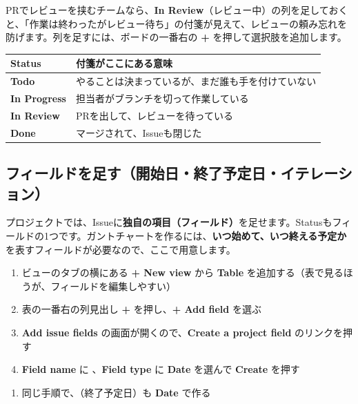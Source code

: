 PRでレビューを挟むチームなら、\textbf{In Review}（レビュー中）の列を足しておくと、「作業は終わったがレビュー待ち」の付箋が見えて、レビューの頼み忘れを防げます。列を足すには、ボードの一番右の \textbf{+} を押して選択肢を追加します。

\begin{center}
\begin{tabularx}{\linewidth}{@{}>{\raggedright\arraybackslash}p{3.0cm} X@{}}
\toprule
Status & 付箋がここにある意味 \\
\midrule
\textbf{Todo} & やることは決まっているが、まだ誰も手を付けていない \\
\textbf{In Progress} & 担当者がブランチを切って作業している \\
\textbf{In Review} & PRを出して、レビューを待っている \\
\textbf{Done} & マージされて、Issueも閉じた \\
\bottomrule
\end{tabularx}
\end{center}

\subsection{フィールドを足す（開始日・終了予定日・イテレーション）}

プロジェクトでは、Issueに\textbf{独自の項目（フィールド）}を足せます。Statusもフィールドの1つです。ガントチャートを作るには、\textbf{いつ始めて、いつ終える予定か}を表すフィールドが必要なので、ここで用意します。

\begin{enumerate}[leftmargin=1.6em]
  \item ビューのタブの横にある \textbf{+ New view} から \textbf{Table} を追加する（表で見るほうが、フィールドを編集しやすい）
  \item 表の一番右の列見出し \textbf{+} を押し、\textbf{+ Add field} を選ぶ
  \item \textbf{Add issue fields} の画面が開くので、\textbf{Create a project field} のリンクを押す
  \item \textbf{Field name} に 、\textbf{Field type} に \textbf{Date} を選んで \textbf{Create} を押す
\end{enumerate}

\begin{enumerate}[leftmargin=1.6em, start=5]
  \item 同じ手順で、（終了予定日）も \textbf{Date} で作る
\end{enumerate}

